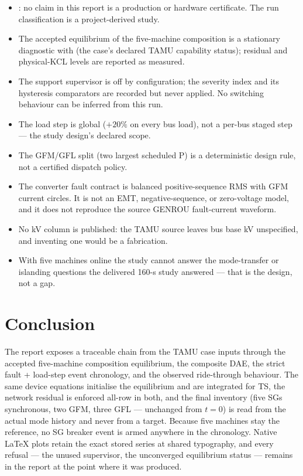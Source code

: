 \documentclass[12pt,a4paper]{article}
\newcommand{\code}[1]{\texttt{\detokenize{#1}}}
\begin{document}
\begin{itemize}
\item \code{production_certified=false}: no claim in this report is a
      production or hardware certificate.  The run classification is a
      project-derived study.
\item The accepted equilibrium of the five-machine composition is a stationary
      diagnostic with \code{eq.converged=false} (the case's declared TAMU
      capability status); residual and physical-KCL levels are reported as
      measured.
\item The support supervisor is off by configuration; the severity index and
      its hysteresis comparators are recorded but never applied.  No switching
      behaviour can be inferred from this run.
\item The load step is global ($+20\%$ on every bus load), not a per-bus
      staged step --- the study design's declared scope.
\item The GFM/GFL split (two largest scheduled P) is a deterministic design
      rule, not a certified dispatch policy.
\item The converter fault contract is balanced positive-sequence RMS with
      GFM current circles.  It is not an EMT, negative-sequence, or
      zero-voltage model, and it does not reproduce the source GENROU
      fault-current waveform.
\item No kV column is published: the TAMU source leaves bus base kV
      unspecified, and inventing one would be a fabrication.
\item With five machines online the study cannot answer the mode-transfer or
      islanding questions the delivered 160-s study answered --- that is the
      design, not a gap.
\end{itemize}

\section{Conclusion}

The report exposes a traceable chain from the TAMU case inputs through the
accepted five-machine composition equilibrium, the composite DAE, the strict
fault + load-step event chronology, and the observed ride-through behaviour.
The same device equations initialise the equilibrium and are integrated for TS,
the network residual is enforced all-row in both, and the final inventory
(five SGs synchronous, two GFM, three GFL --- unchanged from $t=0$) is read
from the actual mode history and never from a target.  Because five machines
stay the reference, no SG breaker event is armed anywhere in the chronology.
Native \LaTeX{} plots retain the exact stored series at shared typography, and
every refusal --- the unused supervisor, the unconverged equilibrium status ---
remains in the report at the point where it was produced.
\end{document}
